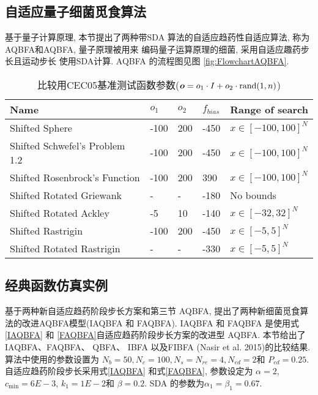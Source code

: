 \subsection{自适应量子细菌觅食算法}
基于量子计算原理, 本节提出了两种带SDA 算法的自适应趋药性自适应算法, 称为 AQBFA和AQBFA, 量子原理被用来 编码量子运算原理的细菌, 采用自适应趣药步长且运动步长 使用SDA计算.
AQBFA 的流程图见图 \ref{fig:FlowchartAQBFA}.
\begin{table}[tb]
\begin{center}
\caption{比较用CEC05基准测试函数参数($\bm o=o_1 \cdot I+o_2\cdot \textup{rand}(1,n)$)}
    \vspace{0.5em}\centering
\begin{tabularx}{0.9\textwidth}{p{6.0cm} p{1.05cm}p{0.75cm}p{1.05cm}p{4.2cm}}
\hline
Name &  $o_1$&  $o_2$&   $f_{bias}$& Range of search\\
\hline
Shifted Sphere &  -100&  200&  -450 &  $x\in [-100,100]^N$\\
Shifted Schwefel's Problem 1.2 &  -100&  200&  -450 &   $x\in [-100,100]^N$\\
Shifted Rosenbrock's Function &  -100&  200&  390 &   $x\in [-100,100]^N$\\
Shifted Rotated Griewank &  -&  -&  -180 &  No bounds\\
Shifted Rotated Ackley&  -5&  10&  -140 &  $x\in [-32,32]^N$\\
Shifted Rastrigin &  -100&  200&  -450 &  $x\in [-5,5]^N$\\
Shifted Rotated  Rastrigin&  -&  -&  -330 &  $x\in [-5,5]^N$\\
\hline
\end{tabularx}
\label{Tab:CEC05ofbias}
\end{center}
\end{table}
\subsection{经典函数仿真实例}
基于两种新自适应趋药阶段步长方案和第三节 AQBFA, 提出了两种新细菌觅食算法的改进AQBFA模型(IAQBFA 和 FAQBFA). IAQBFA 和 FAQBFA 是使用式\eqref{IAQBFA} 和 \eqref{FAQBFA}自适应趋药阶段步长方案的改进型 AQBFA. 本节给出了 IAQBFA、FAQBFA、 QBFA、 IBFA 以及FIBFA (Nasir et al. 2015)的比较结果. 算法中使用的参数设置为 $N_b=50, N_c=100, N_s=N_{re}=4, N_{ed}=2$和 $P_{ed}=0.25$. 自适应趋药阶段步长采用式\eqref{IAQBFA} 和式\eqref{FAQBFA}, 参数设定为 $\alpha=2$, $c_{\min}=6E-3$, $k_1=1E-2$和 $\beta=0.2$. SDA 的参数为$\alpha_1=\beta_1=0.67$.
